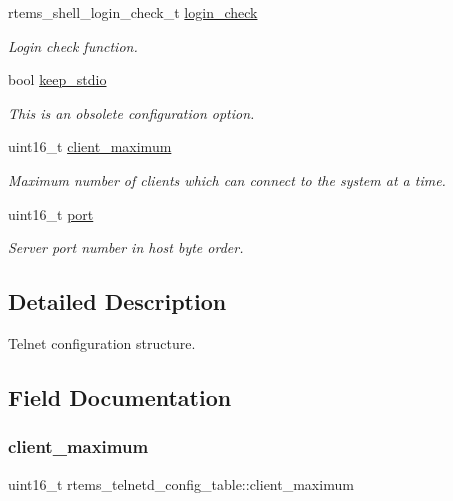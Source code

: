 \begin{DoxyCompactItemize}
rtems\+\_\+shell\+\_\+login\+\_\+check\+\_\+t \mbox{\hyperlink{structrtems__telnetd__config__table_a5b51d31ac9955bc812d59501f725c3ad}{login\+\_\+check}}
\begin{DoxyCompactList}\small\item\em Login check function. \end{DoxyCompactList}\item 
bool \mbox{\hyperlink{structrtems__telnetd__config__table_afe75dfc13600695a97535c67c5cc7173}{keep\+\_\+stdio}}
\begin{DoxyCompactList}\small\item\em This is an obsolete configuration option. \end{DoxyCompactList}\item 
uint16\+\_\+t \mbox{\hyperlink{structrtems__telnetd__config__table_a5a2d78056f7d89489f57a108a406de53}{client\+\_\+maximum}}
\begin{DoxyCompactList}\small\item\em Maximum number of clients which can connect to the system at a time. \end{DoxyCompactList}\item 
uint16\+\_\+t \mbox{\hyperlink{structrtems__telnetd__config__table_a12b0c10773d3db11aadf52943614e899}{port}}
\begin{DoxyCompactList}\small\item\em Server port number in host byte order. \end{DoxyCompactList}\end{DoxyCompactItemize}


\subsection{Detailed Description}
Telnet configuration structure. 

\subsection{Field Documentation}
\mbox{\label{structrtems__telnetd__config__table_a5a2d78056f7d89489f57a108a406de53}} 
\subsubsection{\texorpdfstring{client\_maximum}{client\_maximum}}
{\footnotesize\ttfamily uint16\+\_\+t rtems\+\_\+telnetd\+\_\+config\+\_\+table\+::client\+\_\+maximum}



